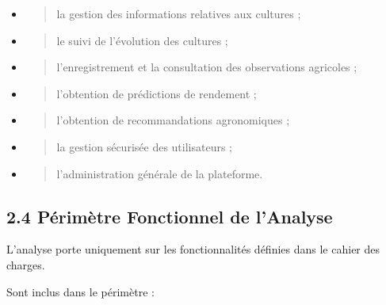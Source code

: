\documentclass[
]{article}
\begin{document}
\begin{itemize}
\item
  \begin{quote}
  la gestion des informations relatives aux cultures ;
  \end{quote}
\item
  \begin{quote}
  le suivi de l'évolution des cultures ;
  \end{quote}
\item
  \begin{quote}
  l'enregistrement et la consultation des observations agricoles ;
  \end{quote}
\item
  \begin{quote}
  l'obtention de prédictions de rendement ;
  \end{quote}
\item
  \begin{quote}
  l'obtention de recommandations agronomiques ;
  \end{quote}
\item
  \begin{quote}
  la gestion sécurisée des utilisateurs ;
  \end{quote}
\item
  \begin{quote}
  l'administration générale de la plateforme.
  \end{quote}
\end{itemize}

\hypertarget{puxe9rimuxe8tre-fonctionnel-de-lanalyse}{%
\subsection{2.4 Périmètre Fonctionnel de
l'Analyse}\label{puxe9rimuxe8tre-fonctionnel-de-lanalyse}}

L'analyse porte uniquement sur les fonctionnalités définies dans le
cahier des charges.

Sont inclus dans le périmètre :
\end{document}
